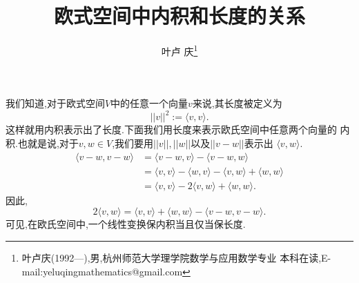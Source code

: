 ﻿\documentclass[a4paper]{article}
\begin{document}
\title{\huge{\bf{欧式空间中内积和长度的关系}}} \author{\small{叶卢
    庆\footnote{叶卢庆(1992---),男,杭州师范大学理学院数学与应用数学专业
      本科在读,E-mail:yeluqingmathematics@gmail.com}}}
\maketitle\ni
我们知道,对于欧式空间$V$中的任意一个向量$v$来说,其长度被定义为
$$
||v||^{2}:=\langle v,v\rangle.
$$
这样就用内积表示出了长度.下面我们用长度来表示欧氏空间中任意两个向量的
内积.也就是说,对于$v,w\in V$,我们要用$||v||,||w||$以及$||v-w||$表示出
$\langle v,w\rangle$.
\begin{align*}
\langle v-w,v-w\rangle&=\langle v-w,v\rangle-\langle
v-w,w\rangle\\&=\langle v,v\rangle -\langle w,v\rangle -\langle
v,w\rangle+\langle w,w\rangle\\&=\langle v,v\rangle -2\langle
v,w\rangle+\langle w,w\rangle.
\end{align*}
因此,
$$
2\langle v,w\rangle =\langle v,v\rangle+\langle w,w\rangle-\langle v-w,v-w\rangle.
$$
可见,在欧氏空间中,一个线性变换保内积当且仅当保长度.
\end{document}
